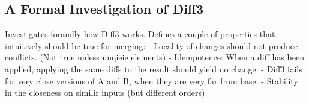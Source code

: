 \documentclass[12pt]{article}
\begin{document}
\subsection{A Formal Investigation of Diff3}
Investigates foramlly how Diff3 works. Defines a couple of properties that intuitively should be true for merging:
- Locality of changes should not produce conflicts. (Not true unless unqieie elements)
- Idempotence: When a diff has been applied, applying the same diffs to the result should yield no change.
- Diff3 fails for very close versions of A and B, when they are very far from base.
- Stability in the closeness on similir inputs (but different orders)




\end{document}
